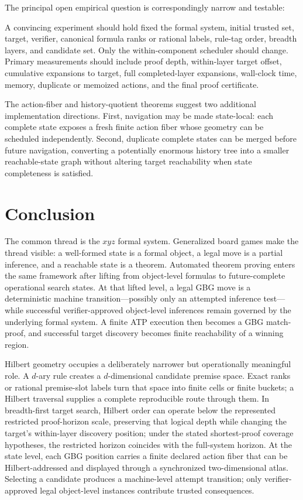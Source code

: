 \documentclass[11pt]{article}
\theoremstyle{definition}
\begin{document}
The principal open empirical question is correspondingly narrow and testable:
\begin{center}
\end{center}
A convincing experiment should hold fixed the formal system, initial trusted set, target, verifier, canonical formula ranks or rational labels, rule-tag order, breadth layers, and candidate set. Only the within-component scheduler should change. Primary measurements should include proof depth, within-layer target offset, cumulative expansions to target, full completed-layer expansions, wall-clock time, memory, duplicate or memoized actions, and the final proof certificate.

The action-fiber and history-quotient theorems suggest two additional implementation directions. First, navigation may be made state-local: each complete state exposes a fresh finite action fiber whose geometry can be scheduled independently. Second, duplicate complete states can be merged before future navigation, converting a potentially enormous history tree into a smaller reachable-state graph without altering target reachability when state completeness is satisfied.

\section{Conclusion}

The common thread is the $xyz$ formal system. Generalized board games make the thread visible: a well-formed state is a formal object, a legal move is a partial inference, and a reachable state is a theorem. Automated theorem proving enters the same framework after lifting from object-level formulas to future-complete operational search states. At that lifted level, a legal GBG move is a deterministic machine transition---possibly only an attempted inference test---while successful verifier-approved object-level inferences remain governed by the underlying formal system. A finite ATP execution then becomes a GBG match-proof, and successful target discovery becomes finite reachability of a winning region.

Hilbert geometry occupies a deliberately narrower but operationally meaningful role. A $d$-ary rule creates a $d$-dimensional candidate premise space. Exact ranks or rational premise-slot labels turn that space into finite cells or finite buckets; a Hilbert traversal supplies a complete reproducible route through them. In breadth-first target search, Hilbert order can operate below the represented restricted proof-horizon scale, preserving that logical depth while changing the target's within-layer discovery position; under the stated shortest-proof coverage hypotheses, the restricted horizon coincides with the full-system horizon. At the state level, each GBG position carries a finite declared action fiber that can be Hilbert-addressed and displayed through a synchronized two-dimensional atlas. Selecting a candidate produces a machine-level attempt transition; only verifier-approved legal object-level instances contribute trusted consequences.
\end{document}
